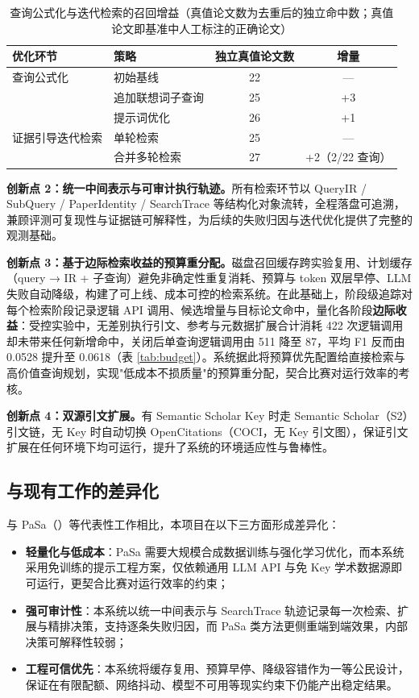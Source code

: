 \documentclass[11pt,a4paper,fontset=macnew]{ctexart}
\begin{document}
\begin{table}[H]
\centering
\caption{查询公式化与迭代检索的召回增益（真值论文数为去重后的独立命中数；真值论文即基准中人工标注的正确论文）}
\label{tab:formulation}
\small
\begin{tabular}{@{}llcc@{}}
\toprule
\textbf{优化环节} & \textbf{策略} & \textbf{独立真值论文数} & \textbf{增量} \\
\midrule
查询公式化 & 初始基线 & 22 & --- \\
 & 追加联想词子查询 & 25 & +3 \\
 & 提示词优化 & 26 & +1 \\
\midrule
证据引导迭代检索 & 单轮检索 & 25 & --- \\
 & 合并多轮检索 & 27 & +2（2/22 查询） \\
\bottomrule
\end{tabular}
\end{table}

\textbf{创新点 2：统一中间表示与可审计执行轨迹。}所有检索环节以 QueryIR / SubQuery / PaperIdentity / SearchTrace 等结构化对象流转，全程落盘可追溯，兼顾评测可复现性与证据链可解释性，为后续的失败归因与迭代优化提供了完整的观测基础。

\textbf{创新点 3：基于边际检索收益的预算重分配。}磁盘召回缓存跨实验复用、计划缓存（query → IR + 子查询）避免非确定性重复消耗、预算与 token 双层早停、LLM 失败自动降级，构建了可上线、成本可控的检索系统。在此基础上，阶段级追踪对每个检索阶段记录逻辑 API 调用、候选增量与目标论文命中，量化各阶段\textbf{边际收益}：受控实验中，无差别执行引文、参考与元数据扩展合计消耗 422 次逻辑调用却未带来任何新增命中，关闭后单查询逻辑调用由 511 降至 87，平均 F1 反而由 0.0528 提升至 0.0618（表 \ref{tab:budget}）。系统据此将预算优先配置给直接检索与高价值查询规划，实现"低成本不损质量"的预算重分配，契合比赛对运行效率的考核。

\textbf{创新点 4：双源引文扩展。}有 Semantic Scholar Key 时走 Semantic Scholar（S2）引文链，无 Key 时自动切换 OpenCitations（COCI，无 Key 引文图），保证引文扩展在任何环境下均可运行，提升了系统的环境适应性与鲁棒性。

\subsection{与现有工作的差异化}
\label{sec:difference}

与 PaSa（\cite{pasa2025}）等代表性工作相比，本项目在以下三方面形成差异化：

\begin{itemize}
  \item \textbf{轻量化与低成本}：PaSa 需要大规模合成数据训练与强化学习优化，而本系统采用免训练的提示工程方案，仅依赖通用 LLM API 与免 Key 学术数据源即可运行，更契合比赛对运行效率的约束；
  \item \textbf{强可审计性}：本系统以统一中间表示与 SearchTrace 轨迹记录每一次检索、扩展与精排决策，支持逐条失败归因，而 PaSa 类方法更侧重端到端效果，内部决策可解释性较弱；
  \item \textbf{工程可信优先}：本系统将缓存复用、预算早停、降级容错作为一等公民设计，保证在有限配额、网络抖动、模型不可用等现实约束下仍能产出稳定结果。
\end{itemize}
\end{document}
